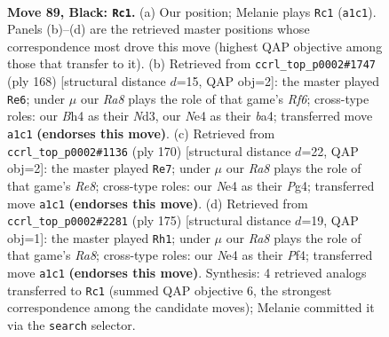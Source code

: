 \documentclass[11pt]{article}
\begin{document}
\clearpage

\begin{figure}[p]\centering
\begin{subfigure}{0.46\textwidth}\centering
\resizebox{\linewidth}{!}{%
\newchessgame
\chessboard[
  setfen={8/8/4k2p/3pp3/1K2n2b/8/1R6/r7 b - - 3 89},
  showmover=false,
  pgfstyle=straightmove, color=movearrow, markmove={a1-c1}
]}
\caption{}
\end{subfigure}\hfill
\begin{subfigure}{0.46\textwidth}\centering
\resizebox{\linewidth}{!}{%
\newchessgame
\chessboard[
  setfen={8/2k5/5R2/8/bPK5/P2N4/8/7r w - - 35 85},
  showmover=false,
  pgfstyle=straightmove, color=movearrow, markmove={f6-e6}
]}
\caption{}
\end{subfigure}
\\[4pt]
\begin{subfigure}{0.46\textwidth}\centering
\resizebox{\linewidth}{!}{%
\newchessgame
\chessboard[
  setfen={4R3/8/r6k/6p1/6P1/5P2/5K2/8 w - - 71 86},
  showmover=false,
  pgfstyle=straightmove, color=movearrow, markmove={e8-e7}
]}
\caption{}
\end{subfigure}\hfill
\begin{subfigure}{0.46\textwidth}\centering
\resizebox{\linewidth}{!}{%
\newchessgame
\chessboard[
  setfen={8/8/8/5p2/5pk1/8/1R3K2/r7 b - - 7 88},
  showmover=false,
  pgfstyle=straightmove, color=movearrow, markmove={a1-h1}
]}
\caption{}
\end{subfigure}
\caption{\textbf{Move 89, Black: \texttt{Rc1}.} (a) Our position; Melanie plays \texttt{Rc1} (\texttt{a1c1}). Panels (b)--(d) are the retrieved master positions whose correspondence most drove this move (highest QAP objective among those that transfer to it). (b) Retrieved from \texttt{ccrl\_top\_p0002\#1747} (ply 168) [structural distance $d$=15, QAP obj=2]: the master played \texttt{Re6}; under $\mu$ our \emph{Ra8} plays the role of that game's \emph{Rf6}; cross-type roles: our \emph{B}h4 as their \emph{N}d3, our \emph{N}e4 as their \emph{b}a4; transferred move \texttt{a1c1} \textbf{(endorses this move)}. (c) Retrieved from \texttt{ccrl\_top\_p0002\#1136} (ply 170) [structural distance $d$=22, QAP obj=2]: the master played \texttt{Re7}; under $\mu$ our \emph{Ra8} plays the role of that game's \emph{Re8}; cross-type roles: our \emph{N}e4 as their \emph{P}g4; transferred move \texttt{a1c1} \textbf{(endorses this move)}. (d) Retrieved from \texttt{ccrl\_top\_p0002\#2281} (ply 175) [structural distance $d$=19, QAP obj=1]: the master played \texttt{Rh1}; under $\mu$ our \emph{Ra8} plays the role of that game's \emph{Ra8}; cross-type roles: our \emph{N}e4 as their \emph{P}f4; transferred move \texttt{a1c1} \textbf{(endorses this move)}. Synthesis: 4 retrieved analogs transferred to \texttt{Rc1} (summed QAP objective 6, the strongest correspondence among the candidate moves); Melanie committed it via the \texttt{search} selector.}
\label{fig:thought-m177}
\end{figure}
\end{document}
